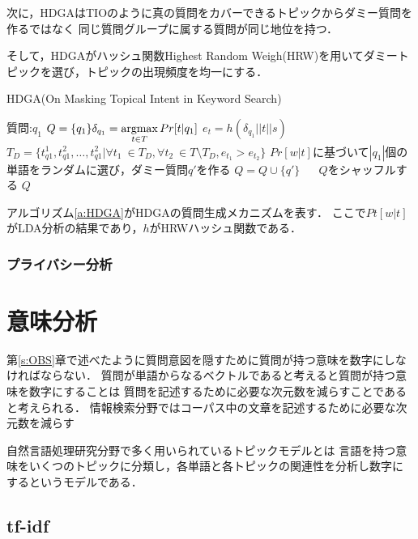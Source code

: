 \documentclass[master]{suribt}
\theoremstyle{definition}
\newcommand{\argmax}{\mathop{\rm argmax}\limits}
\begin{document}
 次に，HDGAはTIOのように真の質問をカバーできるトピックからダミー質問を作るではなく
 同じ質問グループに属する質問が同じ地位を持つ．

 そして，HDGAがハッシュ関数Highest Random Weigh(HRW)\cite{}を用いてダミートピックを選び，トピックの出現頻度を均一にする．

 \begin{algorithm}
 \caption{HDGA(On Masking Topical Intent in Keyword Search)}
 \begin{algorithmic}[1]
  \Require 質問:$q_1$
  \State $Q = \{q_1\}\delta_{q_1} = \argmax_{t \in T} Pr[t|q_1]$
  \State $e_t = h(\delta_{q_1}||t||s)$
  \EndFor
  \State $T_D = \{t^1_{q1},t^2_{q1}, \dots , t^2_{q1} | \forall t_1 \ \in T_D , \forall t_2 \ \in T \setminus T_D, e_{t_1} > e_{t_2} \}$
  \While { $ \argmax_{t \in T} Pr[t|q'] \neq t$}
  \State $Pr[w|t]$に基づいて$|q_1|$個の単語をランダムに選び，ダミー質問$q'$を作る
  \EndWhile
  \State $Q = Q \cup \{q'\}$
  \EndFor　
  \State $Q$をシャッフルする
  \Ensure $Q$
 \end{algorithmic}
 \label{a:HDGA}
 \end{algorithm}

 アルゴリズム\ref{a:HDGA}がHDGAの質問生成メカニズムを表す．
 ここで$Pt[w|t]$がLDA分析の結果であり，$h$がHRWハッシュ関数である．

 \subsection{プライバシー分析}

 \chapter{意味分析} \label{s:sm}
 第\ref{s:OBS}章で述べたように質問意図を隠すために質問が持つ意味を数字にしなければならない．
 質問が単語からなるベクトルであると考えると質問が持つ意味を数字にすることは
 質問を記述するために必要な次元数を減らすことであると考えられる．
 情報検索分野ではコーパス中の文章を記述するために必要な次元数を減らす


 
 自然言語処理研究分野で多く用いられているトピックモデルとは
 言語を持つ意味をいくつのトピックに分類し，各単語と各トピックの関連性を分析し数字にするというモデルである．
 
 \section{tf-idf}
\end{document}
